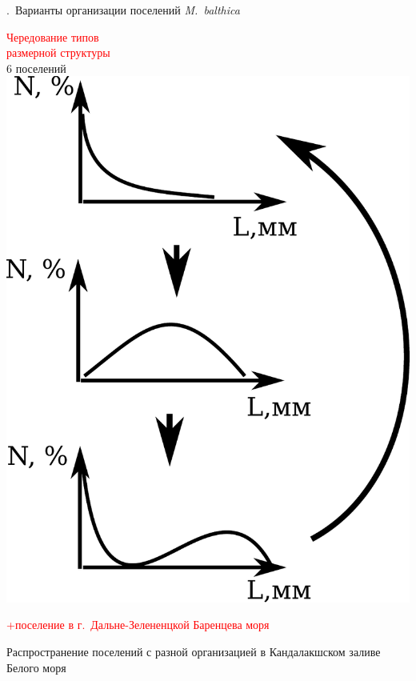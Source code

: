 \documentclass[aspectratio=169, xcolor=table]{beamer}
\begin{document}
\begin{frame}{\insertpagenumber.\ Варианты организации поселений {\it M.~balthica}}
	\begin{minipage}[t]{.3\linewidth}
		\begin{center}
	\textcolor{red}{Чередование типов\\ размерной структуры} \\ 6 поселений \\
			\includegraphics[width=\textwidth]{Dymanic_cheredovanie.pdf}
		\end{center}
\textcolor{red}{\scriptsize +поселение в г.~Дальне-Зелененцкой Баренцева моря}
	\end{minipage}
%
	\begin{minipage}[t]{.35\linewidth}
		\begin{center}
			{\small Распространение поселений с разной организацией в Кандалакшском заливе Белого моря}\\

\end{center}
\end{minipage}
\end{frame}
\end{document}
